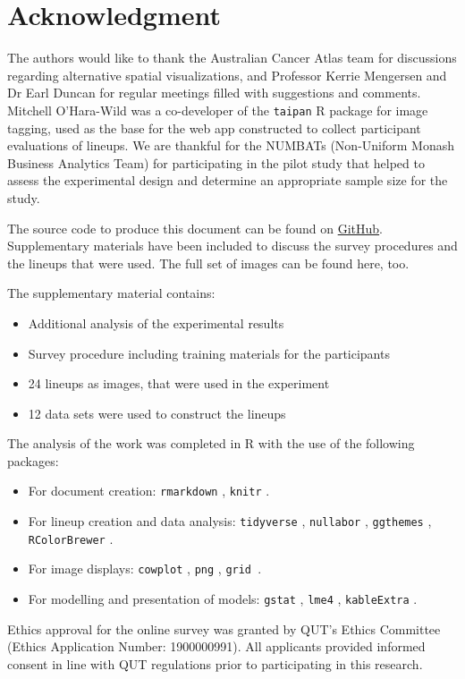 \documentclass[times, doublespace]{anzsauth}
\begin{document}
\section{Acknowledgment}\label{acknowledgment}

The authors would like to thank the Australian Cancer Atlas team for
discussions regarding alternative spatial visualizations, and Professor
Kerrie Mengersen and Dr Earl Duncan for regular meetings filled with
suggestions and comments. Mitchell O'Hara-Wild was a co-developer of the
 \texttt{taipan} \citep{taipan} R package for image tagging, used
as the base for the web app constructed to collect participant
evaluations of lineups. We are thankful for the NUMBATs (Non-Uniform
Monash Business Analytics Team) for participating in the pilot study
that helped to assess the experimental design and determine an
appropriate sample size for the study.

The source code to produce this document can be found on
\href{https://github.com/srkobakian/experiment/paper}{GitHub}.
Supplementary materials have been included to discuss the survey
procedures and the lineups that were used. The full set of images can be
found here, too.

The supplementary material contains:

\begin{itemize}
 \item
  Additional analysis of the experimental results
\item
  Survey procedure including training materials for the participants
\item
  24 lineups as images, that were used in the experiment
\item
  12 data sets were used to construct the lineups
\end{itemize}

The analysis of the work was completed in R
\citep{RCore} with the use of the following packages:

\begin{itemize}
 \item
  For document creation:  \texttt{rmarkdown} \citep{rmarkdown},
   \texttt{knitr}
  \citep{knitr}.
\item
  For lineup creation and data analysis:  \texttt{tidyverse}
  \citep{tidyverse},  \texttt{nullabor}
  \citep{nullabor},  \texttt{ggthemes}
  \citep{ggthemes},  \texttt{RColorBrewer}
 \citep{RColorBrewer}.
\item
  For image displays:  \texttt{cowplot} \citep{cowplot},  \texttt{png}
  \citep{png},  \texttt{grid }\citep{grid}.
\item
  For modelling and presentation of models:  \texttt{gstat}
 \citep{gstat},  \texttt{lme4} \citep{lme4},
   \texttt{kableExtra} \citep{kableExtra}.
\end{itemize}

Ethics approval for the online survey was granted by QUT's Ethics
Committee (Ethics Application Number: 1900000991). All applicants
provided informed consent in line with QUT regulations prior to
participating in this research.



\end{document}
